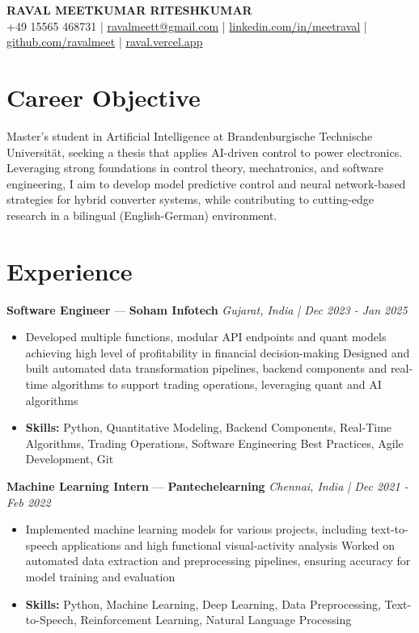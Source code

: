 \documentclass[a4paper,10pt]{article}
\begin{document}
\begin{center}
  {\Large\bfseries RAVAL MEETKUMAR RITESHKUMAR}\\[2pt]
  {\small +49 15565 468731 \;|\; \href{mailto:ravalmeett@gmail.com}{ravalmeett@gmail.com} \;|\; \href{https://www.linkedin.com/in/meetraval/}{linkedin.com/in/meetraval} \;|\; \href{https://github.com/ravalmeet}{github.com/ravalmeet} \;|\; \href{https://raval.vercel.app/}{raval.vercel.app}}
\end{center}
\vspace{-3pt}

\section*{Career Objective}
Master's student in Artificial Intelligence at Brandenburgische Technische Universität, seeking a thesis that applies AI-driven control to power electronics. Leveraging strong foundations in control theory, mechatronics, and software engineering, I aim to develop model predictive control and neural network-based strategies for hybrid converter systems, while contributing to cutting-edge research in a bilingual (English-German) environment.\par

\section*{Experience}
\textbf{Software Engineer} — \textbf{Soham Infotech} \hfill \textit{Gujarat, India \;|\; Dec 2023 - Jan 2025}\par
\vspace{1pt}
\begin{itemize}
  \item Developed multiple functions, modular API endpoints and quant models achieving high level of profitability in financial decision-making Designed and built automated data transformation pipelines, backend components and real-time algorithms to support trading operations, leveraging quant and AI algorithms
  \item \textbf{Skills:} Python, Quantitative Modeling, Backend Components, Real-Time Algorithms, Trading Operations, Software Engineering Best Practices, Agile Development, Git
\end{itemize}
\vspace{3pt}
\textbf{Machine Learning Intern} — \textbf{Pantechelearning} \hfill \textit{Chennai, India \;|\; Dec 2021 - Feb 2022}\par
\vspace{1pt}
\begin{itemize}
  \item Implemented machine learning models for various projects, including text-to-speech applications and high functional visual-activity analysis Worked on automated data extraction and preprocessing pipelines, ensuring accuracy for model training and evaluation
  \item \textbf{Skills:} Python, Machine Learning, Deep Learning, Data Preprocessing, Text-to-Speech, Reinforcement Learning, Natural Language Processing
\end{itemize}
\end{document}
